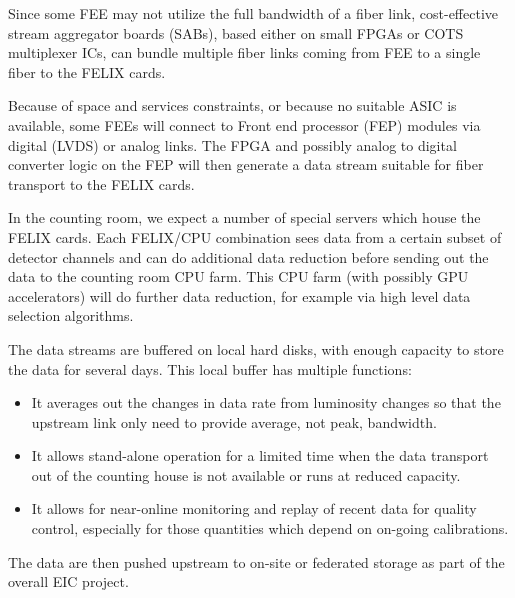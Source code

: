 Since some FEE may not utilize the full bandwidth of a fiber link, cost-effective stream aggregator boards (SABs), based either on small FPGAs or COTS multiplexer ICs, can bundle multiple fiber links coming from FEE to a single fiber to the FELIX cards. 

Because of space and services constraints, or because no suitable ASIC is available, some FEEs will connect to Front end processor (FEP) modules via digital (LVDS) or analog links. The FPGA and possibly analog to digital converter logic on the FEP will then generate a data stream suitable for fiber transport to the FELIX cards.

In the counting room, we expect a number of special servers which house the FELIX cards. Each FELIX/CPU combination sees data from a certain subset of detector channels and can do additional data reduction before sending out the data to the counting room CPU farm. This CPU farm (with possibly GPU accelerators) will do further data reduction, for example via high level data selection algorithms.

The data streams are buffered on local hard disks, with enough capacity to store the data for several days. This local buffer has multiple functions: 
\begin{itemize}
    \item It averages out the changes in data rate from luminosity changes so that the upstream link only need to provide average, not peak, bandwidth.
    \item It allows stand-alone operation for a limited time when the data transport out of the counting house is not available or runs at reduced capacity.
    \item It allows for near-online monitoring and replay of recent data for quality control, especially for those quantities which depend on on-going calibrations.        
\end{itemize}

The data are then pushed upstream to on-site or federated storage as part of the overall EIC project.

